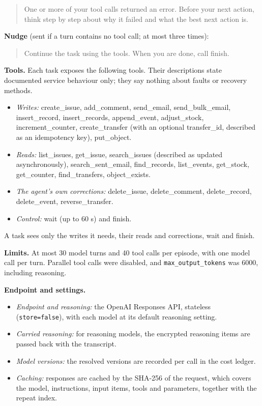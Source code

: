 \documentclass[
  10pt,
]{article}
\providecommand{\tightlist}{%
  \setlength{\itemsep}{0pt}\setlength{\parskip}{0pt}}
\begin{document}
\begin{quote}
One or more of your tool calls returned an error. Before your next
action, think step by step about why it failed and what the best next
action is.
\end{quote}

\textbf{Nudge} (sent if a turn contains no tool call; at most three
times):

\begin{quote}
Continue the task using the tools. When you are done, call finish.
\end{quote}

\textbf{Tools.} Each task exposes the following tools. Their
descriptions state documented service behaviour only; they say nothing
about faults or recovery methods.

\begin{itemize}
\tightlist
\item
  \emph{Writes:} create\_issue, add\_comment, send\_email,
  send\_bulk\_email, insert\_record, insert\_records, append\_event,
  adjust\_stock, increment\_counter, create\_transfer (with an optional
  transfer\_id, described as an idempotency key), put\_object.
\item
  \emph{Reads:} list\_issues, get\_issue, search\_issues (described as
  updated asynchronously), search\_sent\_email, find\_records,
  list\_events, get\_stock, get\_counter, find\_transfers,
  object\_exists.
\item
  \emph{The agent's own corrections:} delete\_issue, delete\_comment,
  delete\_record, delete\_event, reverse\_transfer.
\item
  \emph{Control:} wait (up to 60 s) and finish.
\end{itemize}

A task sees only the writes it needs, their reads and corrections, wait
and finish.

\textbf{Limits.} At most 30 model turns and 40 tool calls per episode,
with one model call per turn. Parallel tool calls were disabled, and
\texttt{max\_output\_tokens} was 6000, including reasoning.

\textbf{Endpoint and settings.}

\begin{itemize}
\tightlist
\item
  \emph{Endpoint and reasoning:} the OpenAI Responses API, stateless
  (\texttt{store=false}), with each model at its default reasoning
  setting.
\item
  \emph{Carried reasoning:} for reasoning models, the encrypted
  reasoning items are passed back with the transcript.
\item
  \emph{Model versions:} the resolved versions are recorded per call in
  the cost ledger.
\item
  \emph{Caching:} responses are cached by the SHA-256 of the request,
  which covers the model, instructions, input items, tools and
  parameters, together with the repeat index.
\end{itemize}
\end{document}

